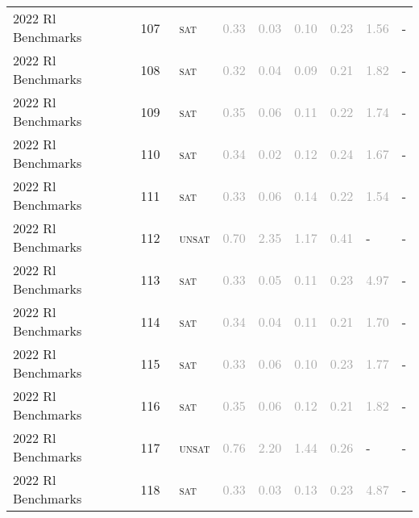 \begin{center}
{\begin{longtable}{@{}lllllllll@{}}
2022 Rl Benchmarks & 107 & ~\textsc{sat} & \textcolor{darkgray}{0.33} & \textcolor{darkgray}{0.03} & \textcolor{darkgray}{0.10} & \textcolor{darkgray}{0.23} & \textcolor{darkgray}{1.56} & - \\
2022 Rl Benchmarks & 108 & ~\textsc{sat} & \textcolor{darkgray}{0.32} & \textcolor{darkgray}{0.04} & \textcolor{darkgray}{0.09} & \textcolor{darkgray}{0.21} & \textcolor{darkgray}{1.82} & - \\
2022 Rl Benchmarks & 109 & ~\textsc{sat} & \textcolor{darkgray}{0.35} & \textcolor{darkgray}{0.06} & \textcolor{darkgray}{0.11} & \textcolor{darkgray}{0.22} & \textcolor{darkgray}{1.74} & - \\
2022 Rl Benchmarks & 110 & ~\textsc{sat} & \textcolor{darkgray}{0.34} & \textcolor{darkgray}{0.02} & \textcolor{darkgray}{0.12} & \textcolor{darkgray}{0.24} & \textcolor{darkgray}{1.67} & - \\
2022 Rl Benchmarks & 111 & ~\textsc{sat} & \textcolor{darkgray}{0.33} & \textcolor{darkgray}{0.06} & \textcolor{darkgray}{0.14} & \textcolor{darkgray}{0.22} & \textcolor{darkgray}{1.54} & - \\
2022 Rl Benchmarks & 112 & ~\textsc{unsat} & \textcolor{darkgray}{0.70} & \textcolor{darkgray}{2.35} & \textcolor{darkgray}{1.17} & \textcolor{darkgray}{0.41} & - & - \\
2022 Rl Benchmarks & 113 & ~\textsc{sat} & \textcolor{darkgray}{0.33} & \textcolor{darkgray}{0.05} & \textcolor{darkgray}{0.11} & \textcolor{darkgray}{0.23} & \textcolor{darkgray}{4.97} & - \\
2022 Rl Benchmarks & 114 & ~\textsc{sat} & \textcolor{darkgray}{0.34} & \textcolor{darkgray}{0.04} & \textcolor{darkgray}{0.11} & \textcolor{darkgray}{0.21} & \textcolor{darkgray}{1.70} & - \\
2022 Rl Benchmarks & 115 & ~\textsc{sat} & \textcolor{darkgray}{0.33} & \textcolor{darkgray}{0.06} & \textcolor{darkgray}{0.10} & \textcolor{darkgray}{0.23} & \textcolor{darkgray}{1.77} & - \\
2022 Rl Benchmarks & 116 & ~\textsc{sat} & \textcolor{darkgray}{0.35} & \textcolor{darkgray}{0.06} & \textcolor{darkgray}{0.12} & \textcolor{darkgray}{0.21} & \textcolor{darkgray}{1.82} & - \\
2022 Rl Benchmarks & 117 & ~\textsc{unsat} & \textcolor{darkgray}{0.76} & \textcolor{darkgray}{2.20} & \textcolor{darkgray}{1.44} & \textcolor{darkgray}{0.26} & - & - \\
2022 Rl Benchmarks & 118 & ~\textsc{sat} & \textcolor{darkgray}{0.33} & \textcolor{darkgray}{0.03} & \textcolor{darkgray}{0.13} & \textcolor{darkgray}{0.23} & \textcolor{darkgray}{4.87} & - \\

\end{longtable}}
\end{center}

